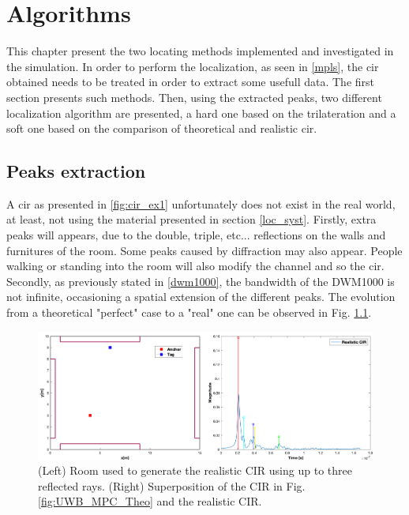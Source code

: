 \chapter{Algorithms}
\label{algos}

This chapter present the two locating methods implemented and investigated in the simulation. In order to perform the localization, as seen in \ref{mpls}, the \gls{cir} obtained needs to be treated in order to extract some usefull data. The first section presents such methods. Then, using the extracted peaks, two different localization algorithm are presented, a hard one based on the trilateration and a soft one based on the comparison of theoretical and realistic \gls{cir}.

\section{Peaks extraction}

A \gls{cir} as presented in \ref{fig:cir_ex1} unfortunately does not exist in the real world, at least, not using the material presented in section \ref{loc_syst}. Firstly, extra peaks will appears, due to the double, triple, etc...  reflections on the walls and furnitures of the room. Some peaks caused by diffraction may also appear. People walking or standing into the room will also modify the channel and so the \gls{cir}. Secondly, as previously stated in \ref{dwm1000}, the bandwidth of the DWM1000 is not infinite, occasioning a spatial extension of the different peaks. The evolution from a theoretical "perfect" case to a "real" one can be observed in Fig. \ref{fig:peaks_real}.

\begin{figure}[H]
\centering
\includegraphics[width=\linewidth]{Images/cir_theo_real.png}
\caption{(Left) Room used to generate the realistic CIR using up to three reflected rays. (Right) Superposition of the CIR in Fig. \ref{fig:UWB_MPC_Theo} and the realistic CIR. \label{fig:peaks_real}}
\end{figure}

